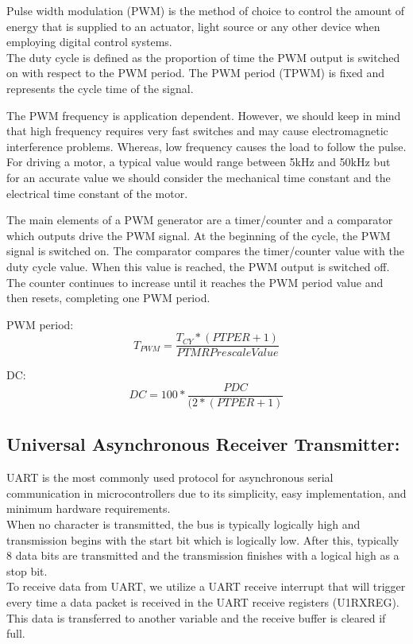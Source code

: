 Pulse width modulation (PWM) is the method of choice to control the amount of energy that is supplied to an actuator, light source or any other device when employing digital control systems.\\
The duty cycle is defined as the proportion of time the PWM output is switched on with respect to the PWM period.
The PWM period (TPWM) is fixed and represents the cycle time of the signal.

The PWM frequency is application dependent. However, we should keep in mind that high frequency requires very fast switches and may cause electromagnetic interference problems. Whereas, low frequency causes the load to follow the pulse.\\
For driving a motor, a typical value would range between 5kHz and 50kHz but for an accurate value we should consider the mechanical time constant and the electrical time constant of the motor.

The main elements of a PWM generator are a timer/counter and a comparator which outputs drive the PWM signal. At the beginning of the cycle, the PWM signal is switched on. The comparator compares the timer/counter value with the duty cycle value. When this value is reached, the PWM output is switched off. The counter continues to increase until it reaches the PWM period value and then resets, completing one PWM period.

PWM period:
$$T_{PWM}=\frac{T_{CY}*(PTPER+1)}{PTMR Prescale Value}$$

DC: 
$$DC=100* \frac{PDC}{(2*(PTPER+1)}$$


\subsection{Universal Asynchronous Receiver Transmitter:}

UART is the most commonly used protocol for asynchronous serial communication in microcontrollers due to its simplicity, easy implementation, and minimum hardware requirements.\\
When no character is transmitted, the bus is typically logically high and transmission begins with the start bit which is logically low. After this, typically 8 data bits are transmitted and the transmission finishes with a logical high as a stop bit.\\
To receive data from UART, we utilize a UART receive interrupt that will trigger every time a data packet is received in the UART receive registers (U1RXREG). This data is transferred to another variable and the receive buffer is cleared if full.

